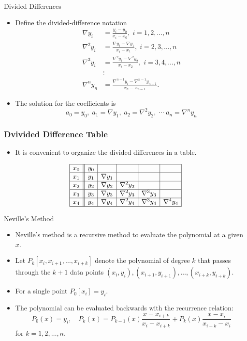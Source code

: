 \documentclass{beamer}
\begin{document}
\begin{frame}{Divided Differences}
\begin{itemize}
\item Define the divided-difference notation 
\begin{align*}
\nabla y_i&=\frac{y_i-y_0}{x_i-x_0}, \; i=1,2,\ldots, n\\
\nabla^2 y_i&=\frac{\nabla y_i-\nabla y_1}{x_i-x_1}, \; i=2,3,\ldots, n\\
\nabla^3 y_i&=\frac{\nabla^2 y_i-\nabla^2 y_2}{x_i-x_2}, \; i=3,4,\ldots, n\\
& \vdots\\
\nabla^n y_n&=\frac{\nabla^{n-1} y_i-\nabla^{n-1} y_{n-1}}{x_n-x_{n-1}}.
\end{align*}
\item The solution for the coefficients is 
\[
a_0=y_0,\; a_1=\nabla y_1, \; a_2=\nabla^2 y_2, \;\cdots\; a_n=\nabla^n y_n
\]
\end{itemize}
\end{frame}

\begin{frame}
  \frametitle{Dvivided Difference Table}
  \begin{itemize}
    \item It is convenient to organize the divided differences in a table.
  \end{itemize}
  \[
  \begin{array}{|c||c|c|c|c|c|}
    \hline x_0 & y_0 & & & & \\
    \hline x_1 & y_1 & \nabla y_1 & & & \\
    \hline x_2 & y_2 & \nabla y_2 & \nabla^2 y_2 & & \\
    \hline x_3 & y_3 & \nabla y_3 & \nabla^2 y_3 & \nabla^3 y_3 & \\
    \hline x_4 & y_4 & \nabla y_4 & \nabla^2 y_4 & \nabla^3 y_4 & \nabla^4 y_4 \\
    \hline
  \end{array}
  \]
  
\end{frame}

\begin{frame}{Neville's Method}
\begin{itemize}
\item Neville's method is a recursive method to evaluate the polynomial at a given $x$.
\item Let $P_k\left[x_i, x_{i+1}, \ldots, x_{i+k}\right]$ denote the polynomial of degree $k$ that passes through the $k+1$ data points 
$\left(x_i, y_i\right),\left(x_{i+1}, y_{i+1}\right), \ldots,\left(x_{i+k}, y_{i+k}\right)$. 
\item For a single point $P_0\left[x_i\right]=y_i$.
\item The polynomial can be evaluated backwards with the recurrence relation:
\[
P_0(x)=y_i,\quad P_k(x)=P_{k-1}(x)\frac{x-x_{i+k}}{x_i-x_{i+k}}+P_k(x)\frac{x-x_i}{x_{i+k}-x_i}
\]
for $k=1,2,\ldots,n$.
\end{itemize}
\end{frame}
\end{document}
